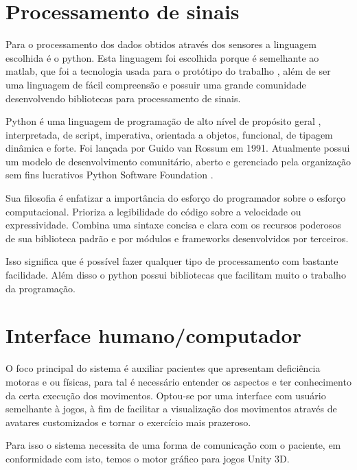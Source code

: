\section{Processamento de sinais}
\label{Sec:Processamento de sinais}
  Para o processamento dos dados obtidos através dos sensores a 
linguagem escolhida é o python. Esta linguagem foi escolhida porque é semelhante ao matlab,
que foi a tecnologia usada para o protótipo do trabalho \cite{roberto}, além de ser uma linguagem
de fácil compreensão e possuir uma grande comunidade desenvolvendo bibliotecas
para processamento de sinais.

  Python é uma linguagem de programação de alto nível de propósito geral \cite{python} , 
interpretada, de script, imperativa, orientada a objetos, funcional, de tipagem 
dinâmica e forte. Foi lançada por Guido van Rossum em 1991.\cite{historiaPython} Atualmente possui
 um modelo de desenvolvimento comunitário, aberto e gerenciado pela organização
 sem fins lucrativos Python Software Foundation \cite{pythonFoudation}.

Sua filosofia é enfatizar a importância do esforço do programador sobre o esforço
 computacional. Prioriza a legibilidade do código sobre a velocidade ou 
expressividade. Combina uma sintaxe concisa e clara com os recursos poderosos de
 sua biblioteca padrão e por módulos e frameworks desenvolvidos por terceiros.

Isso significa que é possível fazer qualquer tipo de processamento com bastante
 facilidade. Além disso o python possui bibliotecas que facilitam muito o trabalho da programação.

\section{Interface humano/computador}
\label{Sec:Interface humano/computador}
  O foco principal do sistema é auxiliar pacientes que apresentam deficiência 
motoras e ou físicas, para tal é necessário entender os aspectos e
ter conhecimento da certa execução dos movimentos. 
Optou-se por uma interface com usuário semelhante à jogos, à fim de facilitar a visualização dos movimentos através de avatares customizados e tornar o exercício mais prazeroso.


Para isso o sistema necessita
de uma forma de comunicação com o paciente, em conformidade com isto, 
temos o motor gráfico para jogos Unity 3D.
  

